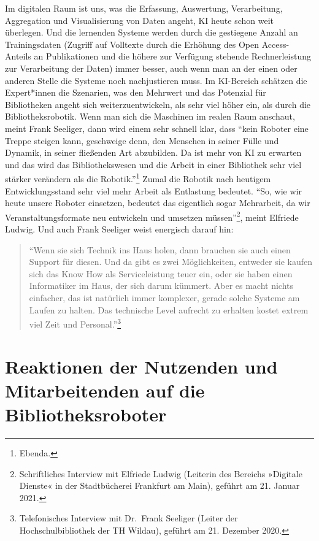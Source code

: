 \documentclass[a4paper,
fontsize=11pt,
oneside,
numbers=noperiodatend,
parskip=half-,
bibliography=totoc,
final
]{scrartcl}
\begin{document}
Im digitalen Raum ist uns, was die Erfassung, Auswertung, Verarbeitung,
Aggregation und Visualisierung von Daten angeht, KI heute schon weit
überlegen. Und die lernenden Systeme werden durch die gestiegene Anzahl
an Trainingsdaten (Zugriff auf Volltexte durch die Erhöhung des Open
Access-Anteils an Publikationen und die höhere zur Verfügung stehende
Rechnerleistung zur Verarbeitung der Daten) immer besser, auch wenn man
an der einen oder anderen Stelle die Systeme noch nachjustieren muss. Im
KI-Bereich schätzen die Expert*innen die Szenarien, was den Mehrwert und
das Potenzial für Bibliotheken angeht sich weiterzuentwickeln, als sehr
viel höher ein, als durch die Bibliotheksrobotik. Wenn man sich die
Maschinen im realen Raum anschaut, meint Frank Seeliger, dann wird einem
sehr schnell klar, dass \enquote{kein Roboter eine Treppe steigen kann,
geschweige denn, den Menschen in seiner Fülle und Dynamik, in seiner
fließenden Art abzubilden. Da ist mehr von KI zu erwarten und das wird
das Bibliothekswesen und die Arbeit in einer Bibliothek sehr viel
stärker verändern als die Robotik.}\footnote{Ebenda.} Zumal die Robotik
nach heutigem Entwicklungsstand sehr viel mehr Arbeit als Entlastung
bedeutet. \enquote{So, wie wir heute unsere Roboter einsetzen, bedeutet
das eigentlich sogar Mehrarbeit, da wir Veranstaltungsformate neu
entwickeln und umsetzen müssen}\footnote{Schriftliches Interview mit
  Elfriede Ludwig (Leiterin des Bereichs »Digitale Dienste« in der
  Stadtbücherei Frankfurt am Main), geführt am 21. Januar 2021.}, meint
Elfriede Ludwig. Und auch Frank Seeliger weist energisch darauf hin:

\begin{quote}
\enquote{Wenn sie sich Technik ins Haus holen, dann brauchen sie auch
einen Support für diesen. Und da gibt es zwei Möglichkeiten, entweder
sie kaufen sich das Know How als Serviceleistung teuer ein, oder sie
haben einen Informatiker im Haus, der sich darum kümmert. Aber es macht
nichts einfacher, das ist natürlich immer komplexer, gerade solche
Systeme am Laufen zu halten. Das technische Level aufrecht zu erhalten
kostet extrem viel Zeit und Personal.}\footnote{Telefonisches Interview
  mit Dr.~Frank Seeliger (Leiter der Hochschulbibliothek der TH Wildau),
  geführt am 21. Dezember 2020.}
\end{quote}

\hypertarget{reaktionen-der-nutzenden-und-mitarbeitenden-auf-die}{%
\section{Reaktionen der Nutzenden und Mitarbeitenden auf
die Bibliotheksroboter}\label{reaktionen-der-nutzenden-und-mitarbeitenden-auf-die Bibliotheksroboter}}
\end{document}
